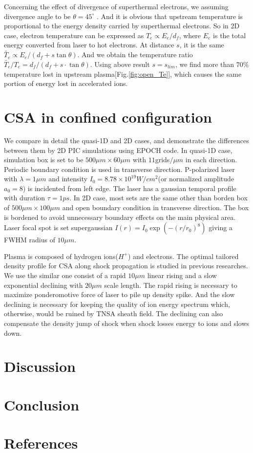 \documentclass[12pt]{iopart}
\begin{document}
Concerning the effect of divergence of superthermal electrons, we assuming divergence angle to be $\theta=45^\circ$  \cite{gibbon_short_2005}. And it is obvious that upstream temperature is proportional to the energy density carried by superthermal electrons. So in 2D case, electron temperature can be expressed as $T_e\propto E_e/d_f$, where $E_e$ is the total energy converted from laser to hot electrons. At distance $s$, it is the same $\tilde{T_e} \propto E_e/(d_f+s\tan{\theta})$. And we obtain the temperature ratio $\tilde{T_e}/T_e=d_f/(d_f+s\cdot\tan{\theta})$. Using above result $s=s_{lim}$, we find more than $70\%$ temperature lost in upstream plasma[Fig.\ref{fig:open_Te}], which causes the same portion of energy lost in accelerated ions.

\section{CSA in confined configuration}
\label{confined}

We compare in detail the quasi-1D and 2D cases, and demonstrate the differences between them by 2D PIC simulations using EPOCH code\cite{arber_contemporary_2015}. In quasi-1D case, simulation box is set to be $500\mu m \times 60\mu m$ with $11$grids$/\mu m$ in each direction. Periodic boundary condition is used in transverse direction. P-polarized laser with $\lambda=1\mu m$ and intensity $I_0=8.78\times 10^{19}W/cm^2$(or normalized amplitude $a_0 = 8$) is incidented from left edge. The laser has a gaussian temporal profile with duration $\tau=1ps$. In 2D case, most sets are the same other than borden box of $500\mu m \times 100\mu m$ and open boundary condition in transverse direction. The box is bordened to avoid unnecessary boundary effects on the main physical area. Laser focal spot is set supergaussian $I(r)=I_0\exp(-(r/r_0)^8)$ giving a FWHM radius of $10\mu m$.

Plasma is composed of hydrogen ions($H^+$) and electrons. The optimal tailored density profile for CSA along shock propagation is studied in previous researches\cite{fiuza_ion_2013,fiuza_laser-driven_2012,boella_numerical_2017}. We use the similar one consist of a rapid $10\mu m$ linear rising and a slow exponential declining with $20\mu m$ scale length. The rapid rising is necessary to maximize ponderomotive force of laser to pile up density spike. And the slow declining is necessary for keeping the quality of ion energy spectrum which, otherwise, would be ruined by TNSA sheath field. The declining can also compensate the density jump  of shock when shock losses energy to ions and slows down\cite{macchi_solitary_2012}. 

 
\section{Discussion}
\label{discussion}


\section{Conclusion}
\label{conclusion}
 
\ack


\section*{References}


\end{document}
